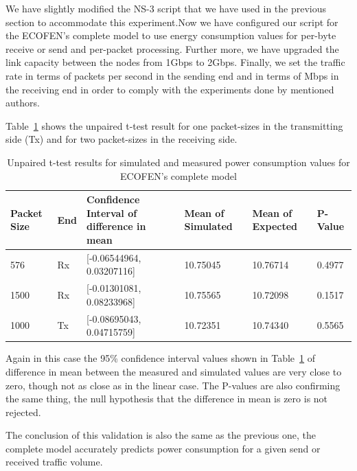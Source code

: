 We have slightly modified the NS-3 script that we have used in the previous section to accommodate this experiment.Now we have configured our script for the ECOFEN's complete model to use energy consumption values for per-byte receive or send and per-packet processing. Further more, we have upgraded the link capacity between the nodes from 1Gbps to 2Gbps. Finally, we set the traffic rate  in terms of packets per second in the sending end and in terms of Mbps in the receiving end in order to comply with the experiments done by mentioned authors. 

Table~\ref{table:complettest} shows the unpaired t-test result for one packet-sizes in the transmitting side (Tx) and for two packet-sizes in the receiving side. 

\begin{table}
	\begin{tabular}{|p{1.3cm}|p{0.7cm}|p{4.6cm}|p{2.1cm}|p{2.1cm}|p{1.2cm}|} 
		\hline 
		\textbf{Packet Size} & End &\textbf{Confidence Interval of difference in mean} & \textbf{Mean of Simulated} & \textbf{Mean of Expected}& \textbf{P-Value}\\ 
		\hline 
		576 &	Rx&	[-0.06544964, 0.03207116]&	10.75045&	10.76714&	0.4977\\
		\hline
		1500&	Rx&	[-0.01301081, 0.08233968]&	10.75565&	10.72098&	0.1517\\ 
		\hline
		1000&	Tx&	[-0.08695043, 0.04715759]&	10.72351&	10.74340&	0.5565\\ 
		\hline	 
	\end{tabular} 
	\caption{Unpaired t-test results for simulated and measured power consumption values for ECOFEN's complete model}
	\label{table:complettest}
\end{table}

Again in this case the 95\% confidence interval values shown in Table~\ref{table:complettest} of difference in mean between the measured and simulated values are very close to zero, though not as close as in the linear case. The P-values are also confirming the same thing, the null hypothesis that the difference in mean is zero is not rejected. 

The conclusion of this validation is also the same as the previous one, the complete model accurately predicts power consumption for a given send or received traffic volume.  

 

